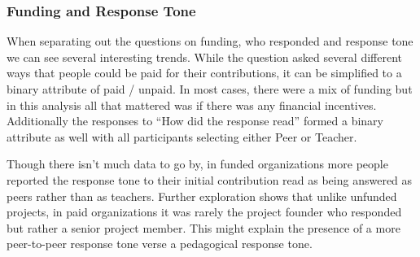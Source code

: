 \subsubsection{Funding and Response Tone}
When separating out the questions on funding, who responded and response tone we can see several interesting trends. While the question asked several different ways that people could be paid for their contributions, it can be simplified to a binary attribute of paid / unpaid. In most cases, there were a mix of funding but in this analysis all that mattered was if there was any financial incentives. Additionally the responses to “How did the response read” formed a binary attribute as well with all participants selecting either Peer or Teacher.

Though there isn't much data to go by, in funded organizations more people reported the response tone to their initial contribution read as being answered as peers rather than as teachers. Further exploration shows that unlike unfunded projects, in paid organizations it was rarely the project founder who responded but rather a senior project member. This might explain the presence of a more peer-to-peer response tone verse a pedagogical response tone.